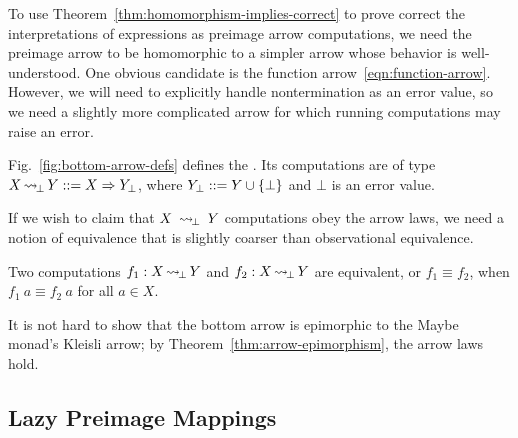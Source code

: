 \documentclass{llncs}
\newcommand{\figref}[1]{Fig.~\ref{#1}}
\newcommand{\arrow}{\rightsquigarrow}
\DeclareMathOperator{\botto}{\arrow_{\mspace{-3mu}\bot}}
\begin{document}
To use Theorem~\ref{thm:homomorphism-implies-correct} to prove correct the interpretations of expressions as preimage arrow computations, we need the preimage arrow to be homomorphic to a simpler arrow whose behavior is well-understood.
One obvious candidate is the function arrow~\eqref{eqn:function-arrow}.
However, we will need to explicitly handle nontermination as an error value, so we need a slightly more complicated arrow for which running computations may raise an error.

\figref{fig:bottom-arrow-defs} defines the .
Its computations are of type $X \botto Y ::= X \tto Y_\bot$, where $Y_\bot ::= Y \cup \{{\bot}\}$ and $\bot$ is an error value.

If we wish to claim that $X~\botto~Y$ computations obey the arrow laws, we need a notion of equivalence that is slightly coarser than observational equivalence.
\begin{definition}
Two computations $f_1 : X \botto Y$ and $f_2 : X \botto Y$ are equivalent, or $f_1 \equiv f_2$, when $f_1~a \equiv f_2~a$ for all $a \in X$.
\end{definition}

It is not hard to show that the bottom arrow is epimorphic to the Maybe monad's Kleisli arrow; by Theorem~\ref{thm:arrow-epimorphism}, the arrow laws hold.

\subsection{Lazy Preimage Mappings}
\label{sec:lazy-preimage-mappings}
\end{document}
